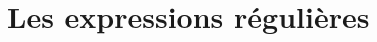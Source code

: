 \documentclass[serif, aspectratio=169]{beamer}
\begin{document}

\section{Les expressions régulières}
\end{document}
